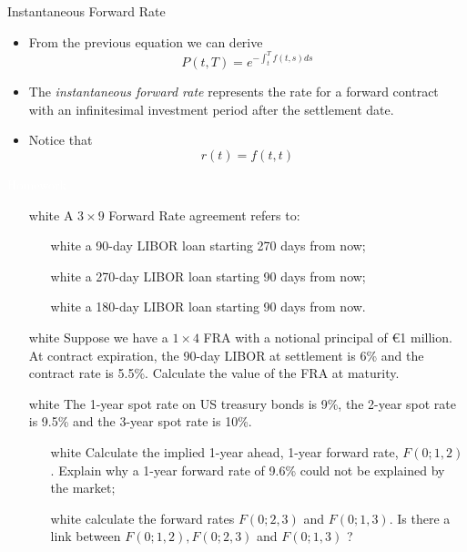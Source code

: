 \documentclass{beamer}
\begin{document}
\begin{frame}{Instantaneous Forward Rate}
	\begin{itemize}
		\item From the previous equation we can derive
		\begin{equation}
			P(t, T) = e^{-\int_t^T f(t, s) ds}
		\end{equation}
		\item The \emph{instantaneous forward rate} represents the rate for a forward contract with an infinitesimal investment period after the settlement date.
		\item Notice that
		\begin{equation*}
			r(t) = f(t,t)
		\end{equation*}
	\end{itemize}
\end{frame}

\begin{homework}
\begin{frame}{\textcolor{white}{Homework}}
\begin{itemize}
	\item[white] A $3\times 9$ Forward Rate agreement refers to:
		\begin{itemize}
			\item[white] a 90-day LIBOR loan starting 270 days from now;
			\item[white] a 270-day LIBOR loan starting 90 days from now;
			\item[white] a 180-day LIBOR loan starting 90 days from now.
		\end{itemize}
	\item[white] Suppose we have a $1\times 4$ FRA with a notional principal of €1 million.  At contract expiration, the 90-day LIBOR at settlement is 6\% and the contract rate is 5.5\%. Calculate the value of the FRA at maturity.
	\item[white] The 1-year spot rate on US treasury bonds is 9\%, the 2-year spot rate is 9.5\% and the 3-year spot rate is 10\%. 
	\begin{itemize}
		\item[white] Calculate the implied 1-year ahead, 1-year forward rate, $F(0;1,2)$. Explain why a 1-year forward rate of 9.6\% could not be explained by the market;
		\item[white] calculate the forward rates  $F(0; 2, 3)$ and $F(0; 1,3)$. Is there a link between $F(0;1,2),F(0;2,3)$ and $F(0;1,3)$ ?
	\end{itemize}
\end{itemize}
\end{frame}
\end{homework}
\end{document}
